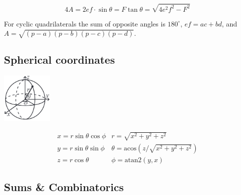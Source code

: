 \documentclass[letterpaper,landscape]{article}
\begin{document}
\begin{multicols*}{3}
\[ 4A = 2ef \cdot \sin\theta = F\tan\theta = \sqrt{4e^2f^2-F^2} \]

 For cyclic quadrilaterals the sum of opposite angles is $180^\circ$,
$ef = ac + bd$, and $A = \sqrt{(p-a)(p-b)(p-c)(p-d)}$.
    
    \subsection{Spherical coordinates}
    \begin{center}
    \includegraphics[width=25mm]{src/figures/SphericalCoordinates.png}
    \end{center}
    \[\begin{array}{cc}
    x = r\sin\theta\cos\phi & r = \sqrt{x^2+y^2+z^2}\\
    y = r\sin\theta\sin\phi & \theta = \textrm{acos}(z/\sqrt{x^2+y^2+z^2})\\
    z = r\cos\theta & \phi = \textrm{atan2}(y,x)
    \end{array}\]

  
    \subsection{Sums \& Combinatorics}
  

\end{multicols*}
\end{document}
